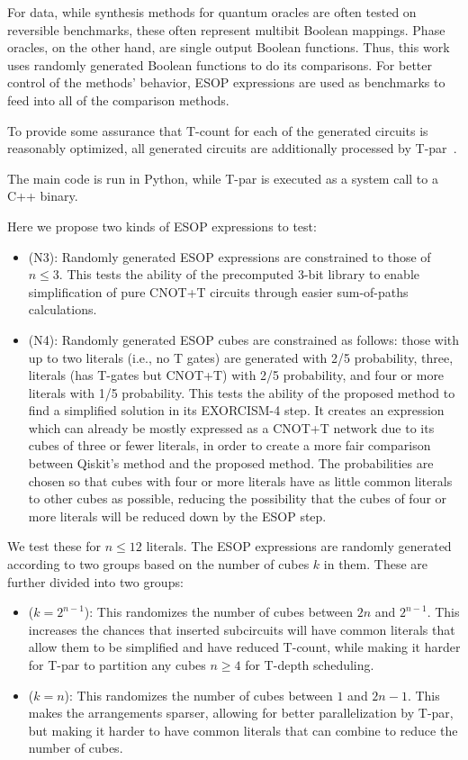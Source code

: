 For data, while synthesis methods for quantum oracles are often tested on reversible benchmarks, these often
represent multibit Boolean mappings. Phase oracles, on the other hand, are single output Boolean functions.
Thus, this work uses randomly generated Boolean functions to do its comparisons. For better control of
the methods' behavior, ESOP expressions are used as benchmarks to feed into all of the comparison
methods.

To provide some assurance that T-count for each of the generated circuits is reasonably optimized, all
generated circuits are additionally processed by T-par~\cite{bib-amy-matroid}.

The main code is run in Python, while T-par is executed as a system call to a C++ binary.

Here we propose two kinds of ESOP expressions to test:

\begin{itemize}
\item (N3): Randomly generated ESOP expressions are constrained to those of $n \leq 3$. This tests the
  ability of the precomputed 3-bit library to enable simplification of pure CNOT+T circuits through
  easier sum-of-paths calculations.
\item (N4): Randomly generated ESOP cubes are constrained as follows: those with up to two literals
  (i.e., no T gates) are generated with 2/5 probability, three, literals (has T-gates but CNOT+T) with
  2/5 probability, and four or more literals with 1/5 probability. This tests the ability of the proposed
  method to find a simplified solution in its EXORCISM-4 step. It creates an expression which can
  already be mostly expressed as a CNOT+T network due to its cubes of three or fewer literals, in order to
  create a more fair comparison between Qiskit's method and the proposed method. The probabilities
  are chosen so that cubes with four or more literals have as little common literals to other cubes as possible,
  reducing the possibility that the cubes of four or more literals will be reduced down by the ESOP step.
\end{itemize}

We test these for $n \leq 12$ literals. The ESOP expressions are randomly generated according to two groups based
on the number of cubes $k$ in them. These are further divided into two groups:

\begin{itemize}
\item ($k=2^{n-1}$): This randomizes the number of cubes between $2n$ and $2^{n-1}$. This increases the chances that
  inserted subcircuits will have common literals that allow them to be simplified and have reduced T-count, while
  making it harder for T-par to partition any cubes $n \geq 4$ for T-depth scheduling.
\item ($k=n$): This randomizes the number of cubes between $1$ and $2n-1$. This makes the arrangements sparser,
  allowing for better parallelization by T-par, but making it harder to have common literals that can combine to
  reduce the number of cubes.
\end{itemize}

